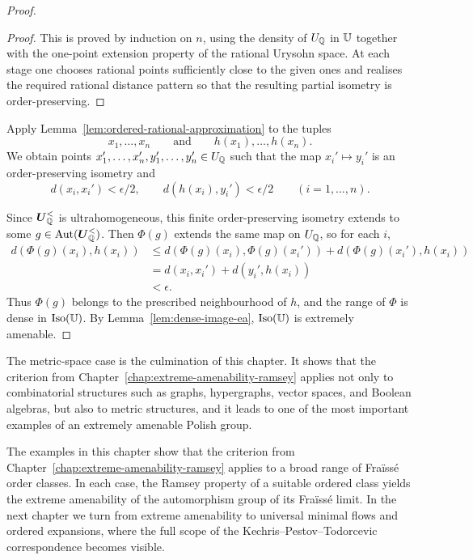 \begin{proof}
    \begin{proof}
        This is proved by induction on \(n\), using the density of \(U_{\mathbb{Q}}\) in \(\mathbb{U}\) together with the one-point extension property of the rational Urysohn space. At each stage one chooses rational points sufficiently close to the given ones and realises the required rational distance pattern so that the resulting partial isometry is order-preserving.
    \end{proof}

    Apply Lemma~\ref{lem:ordered-rational-approximation} to the tuples
    \[
        x_1,\dots,x_n
        \qquad\text{and}\qquad
        h(x_1),\dots,h(x_n).
    \]
    We obtain points \(x_1',\dots,x_n',y_1',\dots,y_n'\in U_{\mathbb{Q}}\) such that the map \(x_i'\mapsto y_i'\) is an order-preserving isometry and
    \[
        d(x_i,x_i')<\epsilon/2,
        \qquad
        d(h(x_i),y_i')<\epsilon/2
        \qquad (i=1,\dots,n).
    \]

    Since \(\boldsymbol{U}_{\mathbb{Q}}^{<}\) is ultrahomogeneous, this finite order-preserving isometry extends to some \(g\in \operatorname{Aut}(\boldsymbol{U}_{\mathbb{Q}}^{<})\).
    Then \(\Phi(g)\) extends the same map on \(U_{\mathbb{Q}}\), so for each \(i\),
    \[
        \begin{aligned}
            d(\Phi(g)(x_i),h(x_i))
             & \leq d(\Phi(g)(x_i),\Phi(g)(x_i')) + d(\Phi(g)(x_i'),h(x_i)) \\
             & = d(x_i,x_i') + d(y_i',h(x_i))                               \\
             & < \epsilon.
        \end{aligned}
    \]
    Thus \(\Phi(g)\) belongs to the prescribed neighbourhood of \(h\), and the range of \(\Phi\) is dense in \(\operatorname{Iso}(\mathbb{U})\). By Lemma~\ref{lem:dense-image-ea}, \(\operatorname{Iso}(\mathbb{U})\) is extremely amenable.
\end{proof}

The metric-space case is the culmination of this chapter. It shows that the criterion from Chapter~\ref{chap:extreme-amenability-ramsey} applies not only to combinatorial structures such as graphs, hypergraphs, vector spaces, and Boolean algebras, but also to metric structures, and it leads to one of the most important examples of an extremely amenable Polish group.

The examples in this chapter show that the criterion from Chapter~\ref{chap:extreme-amenability-ramsey} applies to a broad range of Fraïssé order classes. In each case, the Ramsey property of a suitable ordered class yields the extreme amenability of the automorphism group of its Fraïssé limit. In the next chapter we turn from extreme amenability to universal minimal flows and ordered expansions, where the full scope of the Kechris--Pestov--Todorcevic correspondence becomes visible.
